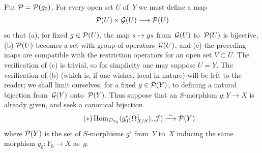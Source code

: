 Put $\cal{P}=\cal{P}(g_0)$. For every open set $U$ of~$Y$ we must
define a map
$$
\cal{P}(U)\times \cal{G}(U)\to \cal{P}(U)
$$
so that (a), for fixed $g\in\cal{P}(U)$, the map $s\mto gs$ from~$\cal{G}(U)$
to~$\cal{P}(U)$ is bijective, (b) $\cal{P}(U)$ becomes a set with group
of operators~$\cal{G}(U)$, and (c) the preceding maps are compatible
with the restriction operators for an open set $V\subset U$. The
verification of (c) is trivial, so for simplicity one may suppose
$U=Y$. The verification of (b) (which is, if one wishes, local in
nature) will be left to the reader; we shall limit ourselves, for a
fixed $g\in\cal{P}(Y)$, to defining a natural bijection from~$\cal{G}(Y)$
onto~$\cal{P}(Y)$. Thus suppose that an $S$-morphism
$g\colon Y\to X$ is already given, and seek a canonical bijection
\begin{equation*}
\label{eq:III.5.1.*}
\tag{$*$}
\Hom_{\cal{O}_{Y_0}}(g_0^*(\Omega^1_{X/S}),\cal{J})\isomto\cal{P}(Y)
\end{equation*}
where $\cal{P}(Y)$ is the set of $S$-morphisms $g'$ from~$Y$ to~$X$
inducing the same morphism $g_0\colon Y_0\to X$ as~$g$.

